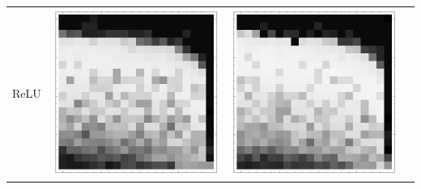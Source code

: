 \documentclass[10pt]{article}
\begin{document}
\begin{tabular}{|c|c|c|c|}
ReLU 
        & \includegraphics[scale=0.25]{plots/simple/LF-20R10R-20T10-MNIST-6.png}
        & \includegraphics[scale=0.25]{plots/simple/LF-40R10R-20T10-MNIST-6.png}

\end{tabular}
\end{document}
